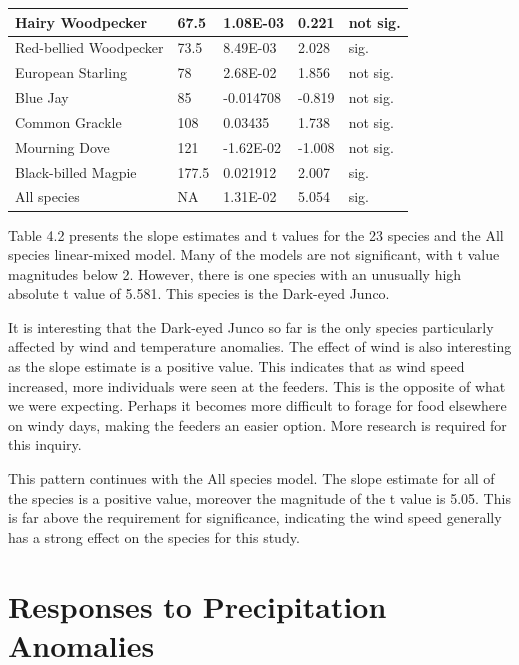 \begin{longtable}[c]{|l|l|l|l|l|}
Hairy Woodpecker          & 67.5              & 1.08E-03       & 0.221   & not sig. \\ \hline
Red-bellied Woodpecker    & 73.5              & 8.49E-03       & 2.028   & sig.     \\ \hline
European Starling         & 78                & 2.68E-02       & 1.856   & not sig. \\ \hline
Blue Jay                  & 85                & -0.014708      & -0.819  & not sig. \\ \hline
Common Grackle            & 108               & 0.03435        & 1.738   & not sig. \\ \hline
Mourning Dove             & 121               & -1.62E-02      & -1.008  & not sig. \\ \hline
Black-billed Magpie       & 177.5             & 0.021912       & 2.007   & sig.     \\ \hline
All species               & NA                & 1.31E-02       & 5.054   & sig.     \\ \hline
\end{longtable}


Table 4.2 presents the slope estimates and t values for the 23 species and the All species linear-mixed model. Many of the models are not significant, with t value magnitudes below 2. However, there is one species with an unusually high absolute t value of 5.581. This species is the Dark-eyed Junco.

It is interesting that the Dark-eyed Junco so far is the only species particularly affected by wind and temperature anomalies. The effect of wind is also interesting as the slope estimate is a positive value. This indicates that as wind speed increased, more individuals were seen at the feeders. This is the opposite of what we were expecting. Perhaps it becomes more difficult to forage for food elsewhere on windy days, making the feeders an easier option. More research is required for this inquiry.

This pattern continues with the All species model. The slope estimate for all of the species is a positive value, moreover the magnitude of the t value is 5.05. This is far above the requirement for significance, indicating the wind speed generally has a strong effect on the species for this study.   

\section{Responses to Precipitation Anomalies}

